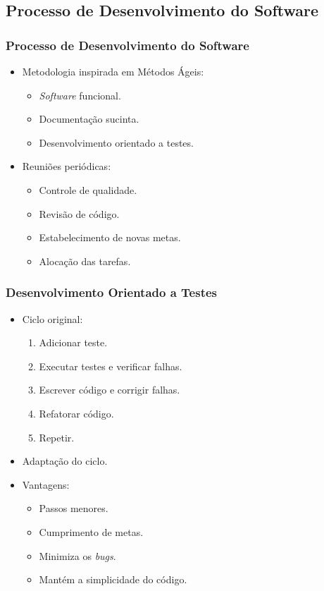 \subsection{Processo de Desenvolvimento do Software}
\frame
{
\frametitle{Processo de Desenvolvimento do Software}
\begin{itemize}
	\item Metodologia inspirada em Métodos Ágeis:
	\begin{itemize}
		\item \emph{Software} funcional.
		\item Documentação sucinta.
		\item Desenvolvimento orientado a testes.
	\end{itemize}
	\item Reuniões periódicas:
	\begin{itemize}
		\item Controle de qualidade.
		\item Revisão de código.
		\item Estabelecimento de novas metas.
		\item Alocação das tarefas.
	\end{itemize}
\end{itemize}
}
\frame
{
\frametitle{Desenvolvimento Orientado a Testes}
\begin{itemize}
	\item Ciclo original:
	\begin{enumerate}
		\item Adicionar teste.
		\item Executar testes e verificar falhas.
		\item Escrever código e corrigir falhas.
		\item Refatorar código.
		\item Repetir.
	\end{enumerate}
	\item Adaptação do ciclo.
	\item Vantagens:
	\begin{itemize}
		\item Passos menores.
		\item Cumprimento de metas.
		\item Minimiza os \emph{bugs}.
		\item Mantém a simplicidade do código.
	\end{itemize}
\end{itemize}
}
